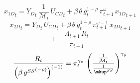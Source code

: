\documentclass[10pt,a4paper]{article}
\begin{document}
\begin{dmath}
{x_{1D}}_{t}={Y_D}_{t}\, \frac{1}{{\mathcal{M}}_{t}}\, {U_{CD}}_{t}+\beta\, {\theta}\, {g}_{t}^{1-\rho}\, {\pi}_{t+1}^{{\omega}}\, {x_{1D}}_{t+1}
\end{dmath}
\begin{dmath}
{x_{2D}}_{t}={Y_D}_{t}\, {U_{CD}}_{t}+\beta\, {\theta}\, {g}_{t}^{1-\rho}\, {\pi}_{t+1}^{{\omega}-1}\, {x_{2D}}_{t+1}
\end{dmath}
\begin{dmath}
1=\frac{{\Lambda}_{t+1}\, {R}_{t}}{{\pi}_{t+1}}
\end{dmath}
\begin{dmath}
\frac{{R}_{t}}{\left(\beta\, {g^{SS}}^{\left(-\rho\right)}\right)^{\left(-1\right)}}={\pi}_{t}^{{{\gamma}_{\pi}}}\, \left(\frac{\frac{1}{{\mathcal{M}}_{t}}}{\frac{1}{{\mkup^{SS}}}}\right)^{{{\gamma}_{y}}}
\end{dmath}
\end{document}
